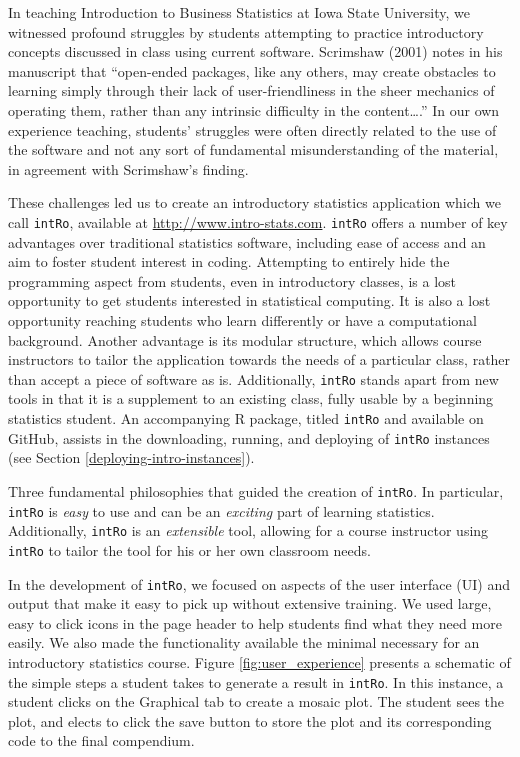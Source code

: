 \documentclass[12pt,]{article}
\begin{document}
In teaching Introduction to Business Statistics at Iowa State
University, we witnessed profound struggles by students attempting to
practice introductory concepts discussed in class using current
software. Scrimshaw (2001) notes in his manuscript that ``open-ended
packages, like any others, may create obstacles to learning simply
through their lack of user-friendliness in the sheer mechanics of
operating them, rather than any intrinsic difficulty in the
content\ldots{}.'' In our own experience teaching, students' struggles
were often directly related to the use of the software and not any sort
of fundamental misunderstanding of the material, in agreement with
Scrimshaw's finding.

These challenges led us to create an introductory statistics application
which we call \texttt{intRo}, available at
\url{http://www.intro-stats.com}. \texttt{intRo} offers a number of key
advantages over traditional statistics software, including ease of
access and an aim to foster student interest in coding. Attempting to
entirely hide the programming aspect from students, even in introductory
classes, is a lost opportunity to get students interested in statistical
computing. It is also a lost opportunity reaching students who learn
differently or have a computational background. Another advantage is its
modular structure, which allows course instructors to tailor the
application towards the needs of a particular class, rather than accept
a piece of software as is. Additionally, \texttt{intRo} stands apart
from new tools in that it is a supplement to an existing class, fully
usable by a beginning statistics student. An accompanying R package,
titled \texttt{intRo} and available on GitHub, assists in the
downloading, running, and deploying of \texttt{intRo} instances (see
Section \ref{deploying-intro-instances}).

Three fundamental philosophies that guided the creation of
\texttt{intRo}. In particular, \texttt{intRo} is \emph{easy} to use and
can be an \emph{exciting} part of learning statistics. Additionally,
\texttt{intRo} is an \emph{extensible} tool, allowing for a course
instructor using \texttt{intRo} to tailor the tool for his or her own
classroom needs.

In the development of \texttt{intRo}, we focused on aspects of the user
interface (UI) and output that make it easy to pick up without extensive
training. We used large, easy to click icons in the page header to help
students find what they need more easily. We also made the functionality
available the minimal necessary for an introductory statistics course.
Figure \ref{fig:user_experience} presents a schematic of the simple
steps a student takes to generate a result in \texttt{intRo}. In this
instance, a student clicks on the Graphical tab to create a mosaic plot.
The student sees the plot, and elects to click the save button to store
the plot and its corresponding code to the final compendium.
\end{document}

